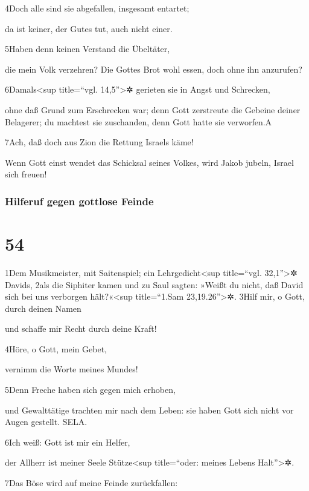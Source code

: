 4Doch alle sind sie abgefallen, insgesamt entartet;

da ist keiner, der Gutes tut, auch nicht einer.

5Haben denn keinen Verstand die Übeltäter,

die mein Volk verzehren? Die Gottes Brot wohl essen, doch ohne ihn
anzurufen?

6Damals\textless sup title=``vgl. 14,5''\textgreater✲ gerieten sie in
Angst und Schrecken,

ohne daß Grund zum Erschrecken war; denn Gott zerstreute die Gebeine
deiner Belagerer; du machtest sie zuschanden, denn Gott hatte sie
verworfen.{A}

7Ach, daß doch aus Zion die Rettung Israels käme!

Wenn Gott einst wendet das Schicksal seines Volkes, wird Jakob jubeln,
Israel sich freuen!

\hypertarget{hilferuf-gegen-gottlose-feinde}{%
\subsubsection{Hilferuf gegen gottlose
Feinde}\label{hilferuf-gegen-gottlose-feinde}}

\hypertarget{section-53}{%
\section{54}\label{section-53}}

1Dem Musikmeister, mit Saitenspiel; ein Lehrgedicht\textless sup
title=``vgl. 32,1''\textgreater✲ Davids, 2als die Siphiter kamen und zu
Saul sagten: »Weißt du nicht, daß David sich bei uns verborgen
hält?«\textless sup title=``1.Sam 23,19.26''\textgreater✲. 3Hilf mir, o
Gott, durch deinen Namen

und schaffe mir Recht durch deine Kraft!

4Höre, o Gott, mein Gebet,

vernimm die Worte meines Mundes!

5Denn Freche haben sich gegen mich erhoben,

und Gewalttätige trachten mir nach dem Leben: sie haben Gott sich nicht
vor Augen gestellt. SELA.

6Ich weiß: Gott ist mir ein Helfer,

der Allherr ist meiner Seele Stütze\textless sup title=``oder: meines
Lebens Halt''\textgreater✲.

7Das Böse wird auf meine Feinde zurückfallen:

